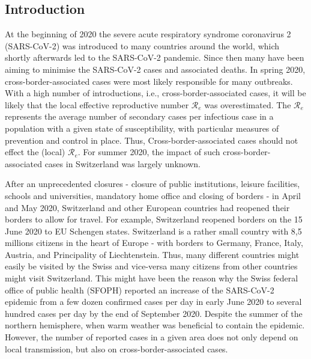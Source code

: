 \documentclass[10pt, a4paper, twoside]{article}
\begin{document}
\begin{multicols}{2}
\section{Introduction}

\lhead{ }
At the beginning of 2020 the severe acute respiratory syndrome coronavirus 2 (SARS-CoV-2) was introduced to many countries around the world, which shortly afterwards led to the SARS-CoV-2 pandemic.
Since then many have been aiming to minimise the SARS-CoV-2 cases and associated deaths.
In spring 2020, cross-border-associated cases were most likely responsible for many outbreaks.\cite{russell_effect_2021}
With a high number of introductions, i.e., cross-border-associated cases, it will be likely that the local effective reproductive number $\mathcal{R}_e$ was overestimated.\cite{roberts_early_2011}
The $\mathcal{R}_e$ represents the average number of secondary cases per infectious case in a population with a given state of susceptibility, with particular measures of prevention and control in place.
Thus, Cross-border-associated cases should not effect the (local) $\mathcal{R}_e$.
For summer 2020, the impact of such cross-border-associated cases in Switzerland was largely unknown.

After an unprecedented closures - closure of public institutions, leisure facilities, schools and universities, mandatory home office and closing of borders -  in April and May 2020, Switzerland and other European countries had reopened their borders to allow for travel. 
For example, Switzerland reopened borders on the 15 June 2020 to EU Schengen states. 
Switzerland is a rather small country with 8,5 millions citizens in the heart of Europe - with borders to Germany, France, Italy, Austria, and Principality of Liechtenstein.
Thus, many different countries might easily be visited by the Swiss and vice-versa many citizens from other countries might visit Switzerland. 
This might have been the reason why the Swiss federal office of public health (SFOPH) reported an increase of the SARS-CoV-2 epidemic from a few dozen confirmed cases per day in early June 2020 to several hundred cases per day by the end of September 2020.
Despite the summer of the northern hemisphere, when warm weather was beneficial to contain the epidemic.\cite{neher_potential_2020} 
However, the number of reported cases in a given area does not only depend on local transmission, but also on cross-border-associated cases.


\end{multicols}
\end{document}
